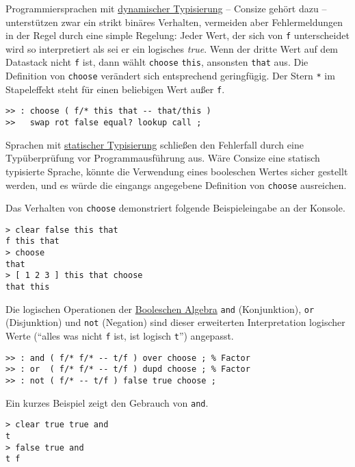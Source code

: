 Programmiersprachen mit \href{http://de.wikipedia.org/wiki/Dynamische\_Typisierung}{dynamischer Typisierung} -- Consize gehört dazu -- unterstützen zwar ein strikt binäres Verhalten, vermeiden aber Fehlermeldungen in der Regel durch eine simple Regelung: Jeder Wert, der sich von \verb|f| unterscheidet wird so interpretiert als sei er ein logisches \emph{true}. Wenn der dritte Wert auf dem Datastack nicht \verb|f| ist, dann wählt \verb|choose| \verb|this|, ansonsten \verb|that| aus. Die Definition von \verb|choose| verändert sich entsprechend geringfügig. Der Stern \verb|*| im Stapeleffekt steht für einen beliebigen Wert außer \verb|f|.

\begin{verbatim}
>> : choose ( f/* this that -- that/this )
>>   swap rot false equal? lookup call ;
\end{verbatim}

Sprachen mit \href{http://de.wikipedia.org/wiki/Statische\_Typisierung}{statischer Typisierung} schließen den Fehlerfall durch eine Typüberprüfung vor Programmausführung aus. Wäre Consize eine statisch typisierte Sprache, könnte die Verwendung eines booleschen Wertes sicher gestellt werden, und es würde die eingangs angegebene Definition von \verb|choose| ausreichen.

Das Verhalten von \verb|choose| demonstriert folgende Beispieleingabe an der Konsole.

\begin{verbatim}
> clear false this that
f this that
> choose
that
> [ 1 2 3 ] this that choose
that this
\end{verbatim}

Die logischen Operationen der \href{http://de.wikipedia.org/wiki/Boolesche\_Algebra}{Booleschen Algebra} \verb|and| (Konjunktion), \verb|or| (Disjunktion) und \verb|not| (Negation) sind dieser erweiterten Interpretation logischer Werte ("`alles was nicht \verb|f| ist, ist logisch \verb|t|"') angepasst.

\begin{verbatim}
>> : and ( f/* f/* -- t/f ) over choose ; % Factor
>> : or  ( f/* f/* -- t/f ) dupd choose ; % Factor 
>> : not ( f/* -- t/f ) false true choose ;
\end{verbatim}

Ein kurzes Beispiel zeigt den Gebrauch von \verb|and|.

\begin{verbatim}
> clear true true and
t
> false true and
t f
\end{verbatim}
  
